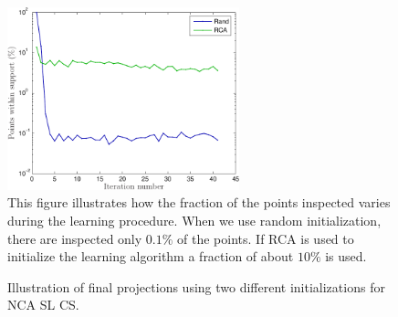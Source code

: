 \begin{figure}
	\centering
	\includegraphics[width=0.6\textwidth]{images/nca-cs-nnzs}
	\caption{This figure illustrates how the fraction of the points inspected varies during the learning procedure. When we use random initialization, there are inspected only $0.1\%$ of the points. If RCA is used to initialize the learning algorithm a fraction of about $10\%$ is used.}
	\label{fig:nca-cs-nnzs}
\end{figure}
\begin{figure}
		 \centering
			    \hspace{0.02\textwidth}
		\caption{Illustration of final projections using two different initializations for NCA SL CS.}
		\label{fig:landsat-projection}
	\end{figure}


